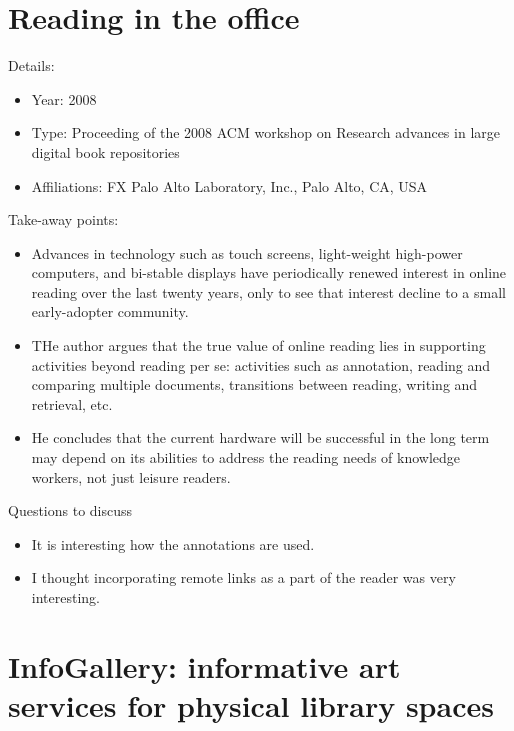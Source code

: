\documentclass[12pt, onecolumn]{IEEEtran}
\begin{document}
\section{Reading in the office
\cite{Golovchinsky:2008:RO:1458412.1458420}}

\noindent Details:
\begin{itemize}
  \item Year: 2008
  \item Type: Proceeding of the 2008 ACM workshop on Research advances in large digital book repositories
  \item Affiliations: FX Palo Alto Laboratory, Inc., Palo Alto, CA, USA
\end{itemize}
\medskip
Take-away points: 
\begin{itemize}
  \item Advances in technology such as touch screens, light-weight 
high-power computers, and bi-stable displays have periodically 
renewed interest in online reading over the last twenty years, 
only to see that interest decline to a small early-adopter 
community.
\item  THe author argues that the true value 
of online reading lies in supporting activities beyond reading per 
se: activities such as annotation, reading and comparing multiple 
documents, transitions between reading, writing and retrieval, 
etc.
\item He concludes that the current hardware will be successful in the long 
term may depend on its abilities to address the reading needs of 
knowledge workers, not just leisure readers.
\end{itemize}
	
\noindent Questions to discuss
\begin{itemize}
  \item It is interesting how the annotations are used.
  \item I thought incorporating remote links as a part of the reader was very
  interesting.
\end{itemize}
\bigskip\bigskip

\section{InfoGallery: informative art services for physical library spaces
\cite{Gronbaek:2006:IIA:1141753.1141757}}
\end{document}
